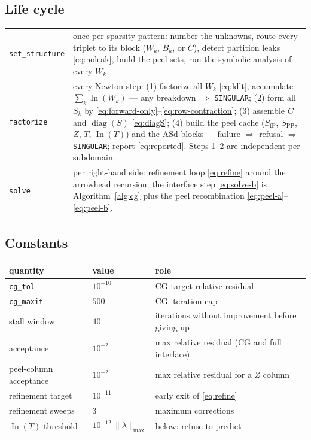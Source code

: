 \documentclass[11pt]{article}
\newcommand{\In}{\operatorname{In}}
\newcommand{\diag}{\operatorname{diag}}
\newcommand{\code}[1]{\texttt{#1}}
\newcommand{\SfP}{S_{\mathrm{fP}}}
\newcommand{\SPP}{S_{\mathrm{PP}}}
\begin{document}
\subsection{Life cycle}

\begin{center}
\begin{tabular}{lp{10.2cm}}
\toprule
\code{set\_structure} & once per sparsity pattern: number the unknowns,
  route every triplet to its block ($W_k$, $B_k$, or $C$), detect partition
  leaks \eqref{eq:noleak}, build the peel sets, run the symbolic analysis of
  every $W_k$.\\[3pt]
\code{factorize} & every Newton step: (1) factorize all $W_k$
  \eqref{eq:ldlt}, accumulate $\sum_k \In(W_k)$ --- any breakdown
  $\Rightarrow$ \code{SINGULAR}; (2) form all $S_k$ by
  \eqref{eq:forward-only}--\eqref{eq:row-contraction}; (3) assemble $C$ and
  $\diag(S)$ \eqref{eq:diagS}; (4) build the peel cache
  ($\SfP$, $\SPP$, $Z$, $T$, $\In(T)$) and the ASd blocks --- failure
  $\Rightarrow$ refusal $\Rightarrow$ \code{SINGULAR}; report
  \eqref{eq:reported}.  Steps 1--2 are independent per subdomain.\\[3pt]
\code{solve} & per right-hand side: refinement loop \eqref{eq:refine} around
  the arrowhead recursion; the interface step \eqref{eq:solve-b} is
  Algorithm~\ref{alg:cg} plus the peel recombination
  \eqref{eq:peel-a}--\eqref{eq:peel-b}.\\
\bottomrule
\end{tabular}
\end{center}

\subsection{Constants}

\begin{center}
\begin{tabular}{lll}
\toprule
quantity & value & role\\
\midrule
\code{cg\_tol} & $10^{-10}$ & CG target relative residual\\
\code{cg\_maxit} & $500$ & CG iteration cap\\
stall window & $40$ & iterations without improvement before giving up\\
acceptance & $10^{-2}$ & max relative residual (CG and full interface)\\
peel-column acceptance & $10^{-2}$ & max relative residual for a $Z$ column\\
refinement target & $10^{-11}$ & early exit of \eqref{eq:refine}\\
refinement sweeps & $3$ & maximum corrections\\
$\In(T)$ threshold & $10^{-12}\,\|\lambda\|_{\max}$ & below: refuse to
  predict\\
\bottomrule
\end{tabular}
\end{center}
\end{document}
